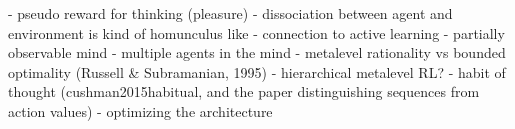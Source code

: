 \label{conclusion}


- pseudo reward for thinking (pleasure)
- dissociation between agent and environment is kind of homunculus like
- connection to active learning
- partially observable mind
- multiple agents in the mind
- metalevel rationality vs bounded optimality (Russell \& Subramanian, 1995)
- hierarchical metalevel RL?
  - habit of thought (cushman2015habitual, and the paper distinguishing sequences from action values)
- optimizing the architecture